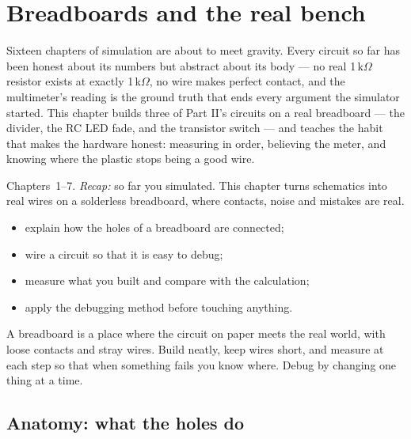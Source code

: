 \chapter{Breadboards and the real bench}\label{ch:breadboard}

Sixteen chapters of simulation are about to meet gravity. Every
circuit so far has been honest about its numbers but abstract about
its body --- no real 1\,k$\Omega$ resistor exists at exactly
1\,k$\Omega$, no wire makes perfect contact, and the multimeter's
reading is the ground truth that ends every argument the simulator
started. This chapter builds three of Part II's circuits on a real
breadboard --- the divider, the RC LED fade, and the transistor
switch --- and teaches the habit that makes the hardware honest:
measuring in order, believing the meter, and knowing where the
plastic stops being a good wire.

\begin{rulebox}
Chapters~1--7. \emph{Recap:} so far you simulated. This chapter turns schematics into real wires on a solderless breadboard, where contacts, noise and mistakes are real.
\end{rulebox}
\begin{wins}
\begin{itemize}
\item explain how the holes of a breadboard are connected;
\item wire a circuit so that it is easy to debug;
\item measure what you built and compare with the calculation;
\item apply the debugging method before touching anything.
\end{itemize}
\end{wins}
\begin{principle}
A breadboard is a place where the circuit on paper meets the real world, with loose contacts and stray wires. Build neatly, keep wires short, and measure at each step so that when something fails you know where. Debug by changing one thing at a time.
\end{principle}

\section{Anatomy: what the holes do}\label{sec:anatomy17}

